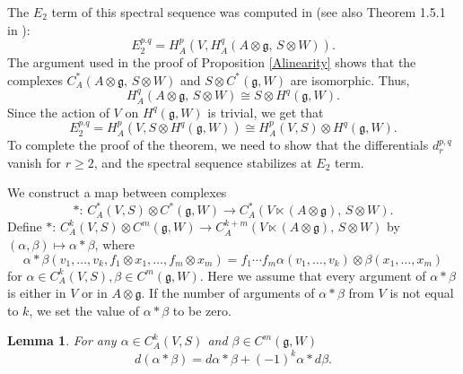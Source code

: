 \documentclass[12pt]{amsart}
\newcommand{\g}{{\mathfrak{g}}}
\newtheorem{lemma}[theorem]{Lemma}
\theoremstyle{definition}
\begin{document}
The $E_2$ term of this spectral sequence was computed in \cite{HochschildSerre1953} (see also Theorem 1.5.1 in \cite{Fuks1986}):
\[
E_2^{p.q} = H_A^p (V, H_A^q (A \otimes \g,\, S \otimes W)).
\]
The argument used in the proof of Proposition \ref{Alinearity} shows that the complexes $C^*_A(A \otimes \g,\, S \otimes W)$ and $S \otimes C^*(\g, W)$
are isomorphic. Thus,
\[
 H_A^q (A \otimes \g,\, S \otimes W) \cong S \otimes H^q (\g, W).
\]
Since the action of $V$ on $H^q (\g, W)$ is trivial, we get that
\[
E_2^{p.q} =  H_A^p (V, S \otimes H^q (\g, W)) \cong H_A^p (V, S) \otimes H^q (\g, W).
\]
To complete the proof of the theorem, we need to show that the differentials $d_r^{p,q}$ vanish for $r\geq 2$, and the spectral sequence stabilizes at $E_2$ term.

 We construct a map between complexes
 \[
 \ast: \, C^*_A (V, S) \otimes C^* (\g, W) \rightarrow C^*_A (V \ltimes (A \otimes \g),\, S \otimes W).
 \]
 Define $\ast:\, C_A^k(V, S) \otimes C^m(\g, W) \rightarrow C_A^{k+m}(V \ltimes (A \otimes \g), \, S \otimes W)$ by $(\alpha, \beta) \mapsto \alpha \ast \beta$, where 
\begin{equation}\label{equation:starmap}
\alpha \ast \beta (v_1, \dots, v_k, f_1 \otimes x_1, \dots, f_m \otimes x_m) = f_1 \cdots f_m \alpha(v_1, \dots, v_k) \otimes \beta(x_1, \dots, x_m)
\end{equation}
for $\alpha \in C_A^k(V, S), \beta \in C^m(\g, W)$. 
Here we assume that every argument of $\alpha \ast \beta$ is either in $V$ or in $A \otimes \g$. If the number of arguments of $\alpha \ast \beta$ from $V$ is not equal to $k$, we set the value of $\alpha \ast \beta$ to be zero.

\begin{lemma}
For any $\alpha \in C_A^k(V,S)$ and $\beta \in C^m(\g, W)$ 
\[
d(\alpha \ast \beta) = d \alpha \ast \beta + (-1)^k\alpha \ast d \beta.
\]
\end{lemma}
\end{document}
